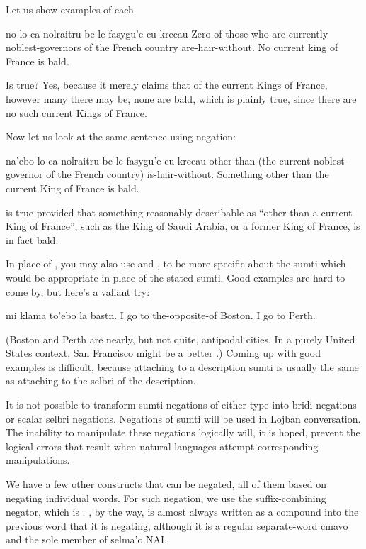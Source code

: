 Let us show examples of each.
\begin{example}
no lo ca nolraitru\n
\T	be le fasygu'e cu krecau\n
Zero of those who are currently noblest-governors\n
\T	of the French country are-hair-without.\n
No current king of France is bald.
\end{example}

Is  true? Yes, because it
    merely claims that of the current Kings of France, however many
    there may be, none are bald, which is plainly true, since there
    are no such current Kings of France.

Now let us look at the same sentence using 
    negation:
\begin{example}
na'ebo lo ca nolraitru\n
\T	be le fasygu'e cu krecau\n
{} other-than-(the-current-noblest-governor\n
\T	of the French country) is-hair-without.\n
Something other than the current King of France is bald.
\end{example}

 is true provided that something
    reasonably describable as ``other than a current King of
    France'', such as the King of Saudi Arabia, or a former King of
    France, is in fact bald. 

In place of , you may also use  and
    , to be more specific about the sumti which would be
    appropriate in place of the stated sumti. Good examples are
    hard to come by, but here's a valiant try:
\begin{example}
mi klama to'ebo la bastn.\n
I go to the-opposite-of Boston.\n
I go to Perth.
\end{example}

(Boston and Perth are nearly, but not quite, antipodal cities.
    In a purely United States context, San Francisco might be a
    better .) Coming up with good examples is
    difficult, because attaching  to a description sumti
    is usually the same as attaching  to the selbri of the
    description. 

It is not possible to transform sumti negations of either
    type into bridi negations or scalar selbri negations. Negations
    of sumti will be used in Lojban conversation. The inability to
    manipulate these negations logically will, it is hoped, prevent
    the logical errors that result when natural languages attempt
    corresponding manipulations.



We have a few other constructs that can be negated, all of
    them based on negating individual words. For such negation, we
    use the suffix-combining negator, which is . , by
    the way, is almost always written as a compound into the
    previous word that it is negating, although it is a regular
    separate-word cmavo and the sole member of selma'o NAI.

